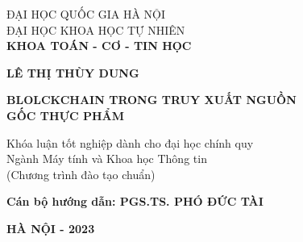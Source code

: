 \begin{titlepage}
    \begin{center}        
        {\fontsize{14}{10}\selectfont 
        ĐẠI HỌC QUỐC GIA HÀ NỘI\\
        ĐẠI HỌC KHOA HỌC TỰ NHIÊN\\
        \fontsize{13}{16}\selectfont \textbf{KHOA TOÁN - CƠ - TIN HỌC}
        }
        \end{center}
        
        \vspace*{3cm}
        
        \begin{center}
            {
                \fontsize{14}{0}\selectfont \textbf{LÊ THỊ THÙY DUNG}
            }
        \end{center}
        \begin{center}
       
        \vspace*{3cm}
        {\fontsize{18}{24}\selectfont \textbf{ BLOLCKCHAIN TRONG TRUY XUẤT NGUỒN \\ GỐC THỰC PHẨM}}
        \end{center}
        \vspace*{2cm}
        \begin{center}
        {
        \fontsize{14}{16}\selectfont Khóa luận tốt nghiệp dành cho đại học chính quy \\
        \fontsize{14}{16}\selectfont Ngành Máy tính và Khoa học Thông tin \\
        (Chương trình đào tạo chuẩn)
        }
        \end{center}
  
        \vspace*{1cm}
        \begin{center}
            {
                \fontsize{14}{0}\selectfont \textbf{ Cán bộ hướng dẫn: PGS.TS. PHÓ ĐỨC TÀI}
            }
        \end{center}
        \vfill
         \centerline{
            \fontsize{14}{0}\selectfont \textbf{ HÀ NỘI - 2023}}
        
    \end{titlepage}
    
    